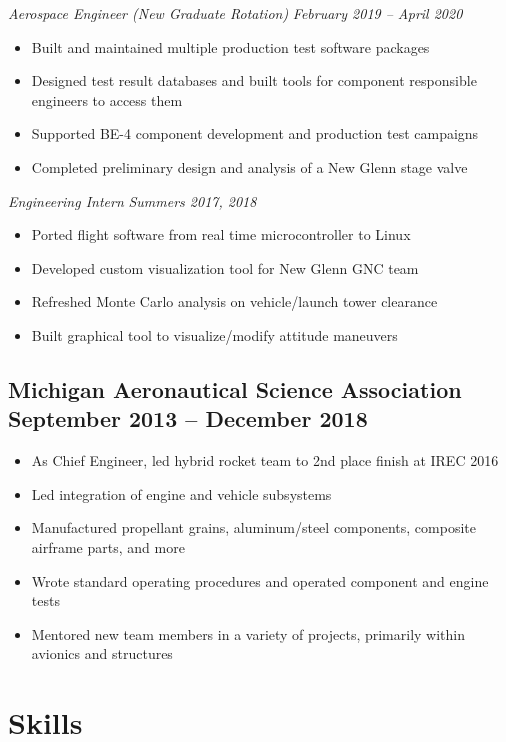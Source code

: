 \documentclass{article}
\begin{document}
\raggedleft\textit{Aerospace Engineer (New Graduate Rotation)} \hfill \textit{February 2019 -- April 2020}
\begin{itemize}
    \item Built and maintained multiple production test software packages
    \item Designed test result databases and built tools for component responsible engineers to access them
    \item Supported BE-4 component development and production test campaigns
    \item Completed preliminary design and analysis of a New Glenn stage valve
\end{itemize}

\raggedleft\textit{Engineering Intern} \hfill \textit{Summers 2017, 2018}
\begin{itemize}
    \item Ported flight software from real time microcontroller to Linux
    \item Developed custom visualization tool for New Glenn GNC team
    \item Refreshed Monte Carlo analysis on vehicle/launch tower clearance
    \item Built graphical tool to visualize/modify attitude maneuvers
\end{itemize}

\bigskip

\subsection{\textbf{Michigan Aeronautical Science Association} \hfill September 2013 -- December 2018}
\begin{itemize}
    \item As Chief Engineer, led hybrid rocket team to 2nd place finish at IREC 2016
    \item Led integration of engine and vehicle subsystems
    \item Manufactured propellant grains, aluminum/steel components, composite airframe parts, and more
    \item Wrote standard operating procedures and operated component and engine tests
    \item Mentored new team members in a variety of projects, primarily within avionics and structures
\end{itemize}

\bigskip

\section{Skills}
\end{document}
